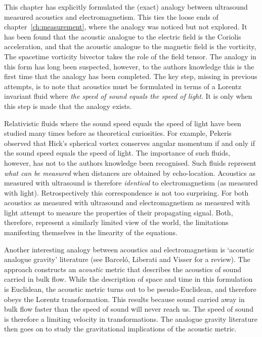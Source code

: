 \documentclass[10pt, fleqn,draft,showtrims,oldfontcommands]{article} %
\newcommand{\chapref}[1]{chapter~\ref{ch:#1}}
\begin{document}
This  chapter has explicitly formulated the (exact) analogy between ultrasound measured acoustics 
and electromagnetism.
This ties the loose ends of \chapref{measurement}, where the analogy was noticed but not explored.
It has been found that the acoustic analogue to the electric field is the Coriolis acceleration,
and that the acoustic analogue to the magnetic field is the vorticity,
The spacetime vorticity bivector takes the role of the field tensor.
The analogy in this form has long been suspected\cite{Marmanis2000,Sridhar1998},
however, to the authors knowledge this is the first time that the analogy has been  completed.
The key step, missing in previous attempts, 
is to note that acoustics must be formulated in terms of a Lorentz invariant fluid where
{\em the speed of sound equals the speed of light}.
It is only when this step is made that the analogy exists.

Relativistic fluids where the sound speed equals the speed of light have been studied many times before
as theoretical curiosities\cite{Taub1978,Pekeris1977}.
For example, Pekeris observed that Hick's spherical vortex conserves angular momentum if and only if
the sound speed equals the speed of light\cite{Pekeris1977}.
The importance of such fluids, however, has not to the authors knowledge been recognised.
Such fluids represent {\em what can be measured} when distances are obtained by echo-location.
Acoustics as measured with ultrasound is therefore {\em identical} to electromagnetism (as measured with light).
Retrospectively this correspondence is not too surprising.
For both acoustics as measured with ultrasound and electromagnetism as measured with light 
attempt to measure the properties of their propagating signal.
Both, therefore, 
represent a similarly limited view of the world,
the limitations manifesting themselves in the linearity of the equations.

Another interesting analogy between acoustics and electromagnetism is `acoustic analogue gravity' literature (see Barcel{\'o}, Liberati and Visser\cite{Barcelo2005} for a review).
The approach constructs an {\em acoustic} metric that describes the acoustics of sound carried in bulk flow.
While the description of space and time in this formulation is Euclidean, the acoustic metric turns out to be pseudo-Euclidean,
and therefore obeys the Lorentz transformation.
This results because sound carried away in bulk flow  faster than the speed of sound will never reach us.
The speed of sound is  therefore a limiting velocity in transformations.
The analogue gravity literature then goes on to study the gravitational implications of the acoustic metric.
\end{document}
